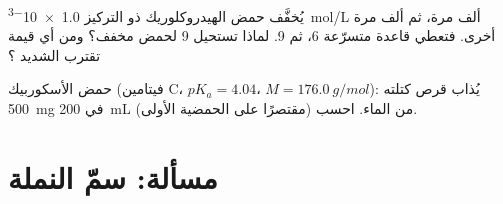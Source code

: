 \begin{exercise}[$\star\star\star$]\label{exo:g12:ka-and-pka:14}
يُخفَّف حمض الهيدروكلوريك ذو التركيز \qty{1.0e-3}{mol/L} ألف مرة،
ثم ألف مرة أخرى. فتعطي قاعدة متسرّعة  6، ثم  9. لماذا
تستحيل  9 لحمض مخفف؟ ومن أي قيمة تقترب  
الشديد ؟
\end{exercise}

\begin{exercise}[$\star\star\star$]\label{exo:g12:ka-and-pka:15}
حمض الأسكوربيك (فيتامين C، $pK_a = 4.04$، $M = \qty{176.0}{g/mol}$): يُذاب
قرص كتلته \qty{500}{mg} في \qty{200}{mL} من الماء. احسب
 (مقتصرًا على الحمضية الأولى).
\end{exercise}

\section{مسألة: سمّ النملة}


